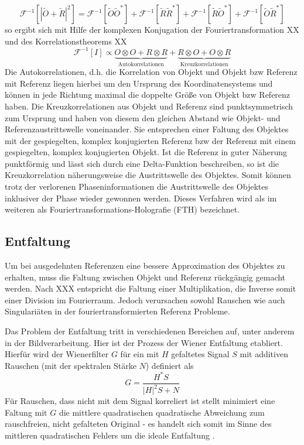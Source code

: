 \begin{equation}
	\mathscr{F}^{-1}\left[\left|\tilde{O}+\tilde{R}\right|^2\right]=
	\mathscr{F}^{-1}\left[\tilde{O}\tilde{O}^*\right]+
	\mathscr{F}^{-1}\left[\tilde{R}\tilde{R}^*\right]+
	\mathscr{F}^{-1}\left[\tilde{R}\tilde{O}^*\right]+
	\mathscr{F}^{-1}\left[\tilde{O}\tilde{R}^*\right]
\end{equation}
so ergibt sich mit Hilfe der komplexen Konjugation der Fouriertransformation XX und des Korrelationstheorems XX
\begin{equation}
	\mathscr{F}^{-1}[I]\propto \underbrace{O \otimes O + R\otimes R}_{\text{Autokorrelationen}}+\underbrace{R\otimes O+ O\otimes R}_{\text {Kreuzkorrelationen}}
\end{equation}
Die Autokorrelationen, d.h. die Korrelation von Objekt und Objekt bzw Referenz mit Referenz liegen hierbei um den Ursprung des Koordinatensystems und können in jede Richtung maximal die doppelte Größe von Objekt bzw Referenz haben. Die Kreuzkorrelationen aus Objekt und Referenz sind punktsymmetrisch zum Ursprung und haben von diesem den gleichen Abstand wie Objekt- und Referenzaustrittswelle voneinander.
Sie  entsprechen einer Faltung des Objektes mit der gespiegelten, komplex konjugierten Referenz bzw der Referenz mit einem gespiegelten, komplex konjugierten Objekt.  Ist die Referenz in guter Näherung punktförmig und lässt sich durch eine Delta-Funktion beschreiben, so ist die Kreuzkorrelation näherungsweise die Austrittswelle des Objektes. Somit können trotz der verlorenen Phaseninformationen die Austrittswelle des Objektes inklusiver der Phase wieder gewonnen werden. Dieses Verfahren wird als im weiteren als Fouriertransformations-Holografie (FTH) bezeichnet.
\subsection{Entfaltung}
Um bei ausgedehnten Referenzen eine bessere Approximation des Objektes zu erhalten, muss die Faltung zwischen Objekt und Referenz rückgängig gemacht werden. Nach  XXX entspricht die Faltung einer Multiplikation, die Inverse somit einer Division im Fourierraum. Jedoch verursachen sowohl Rauschen wie auch Singulariäten in der fouriertransformierten Referenz Probleme.

Das Problem der Entfaltung tritt in verschiedenen Bereichen auf, unter anderem in der Bildverarbeitung.
Hier ist der Prozess der Wiener Entfaltung etabliert. Hierfür wird der Wienerfilter $G$ für ein mit $H$ gefaltetes Signal $S$ mit additiven Rauschen (mit der spektralen Stärke $N$) definiert als
\begin{equation}
	G=\frac{H^* S}{\left|H\right|^2 S+N}
\end{equation}
Für Rauschen, dass nicht mit dem Signal korreliert ist stellt minimiert eine Faltung mit $G$ die mittlere quadratischen quadratische Abweichung zum rauschfreien, nicht gefalteten Original - es handelt sich somit im Sinne des mittleren quadratischen Fehlers um die ideale Entfaltung \cite{castleman1996}.

